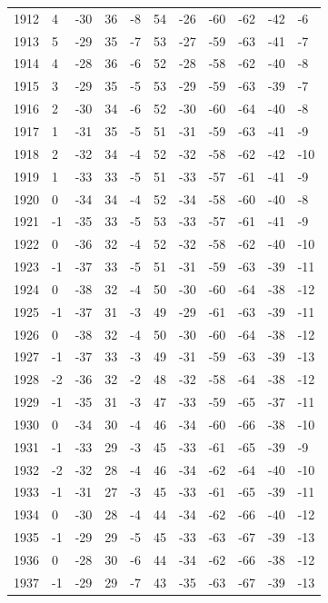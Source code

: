 \begin{table}[H]
\begin{tabular}{lllllllllll}
1912 & 4 & -30 & 36 & -8 & 54 & -26 & -60 & -62 & -42 & -6 \\
1913 & 5 & -29 & 35 & -7 & 53 & -27 & -59 & -63 & -41 & -7 \\
1914 & 4 & -28 & 36 & -6 & 52 & -28 & -58 & -62 & -40 & -8 \\
1915 & 3 & -29 & 35 & -5 & 53 & -29 & -59 & -63 & -39 & -7 \\
1916 & 2 & -30 & 34 & -6 & 52 & -30 & -60 & -64 & -40 & -8 \\
1917 & 1 & -31 & 35 & -5 & 51 & -31 & -59 & -63 & -41 & -9 \\
1918 & 2 & -32 & 34 & -4 & 52 & -32 & -58 & -62 & -42 & -10 \\
1919 & 1 & -33 & 33 & -5 & 51 & -33 & -57 & -61 & -41 & -9 \\
1920 & 0 & -34 & 34 & -4 & 52 & -34 & -58 & -60 & -40 & -8 \\
1921 & -1 & -35 & 33 & -5 & 53 & -33 & -57 & -61 & -41 & -9 \\
1922 & 0 & -36 & 32 & -4 & 52 & -32 & -58 & -62 & -40 & -10 \\
1923 & -1 & -37 & 33 & -5 & 51 & -31 & -59 & -63 & -39 & -11 \\
1924 & 0 & -38 & 32 & -4 & 50 & -30 & -60 & -64 & -38 & -12 \\
1925 & -1 & -37 & 31 & -3 & 49 & -29 & -61 & -63 & -39 & -11 \\
1926 & 0 & -38 & 32 & -4 & 50 & -30 & -60 & -64 & -38 & -12 \\
1927 & -1 & -37 & 33 & -3 & 49 & -31 & -59 & -63 & -39 & -13 \\
1928 & -2 & -36 & 32 & -2 & 48 & -32 & -58 & -64 & -38 & -12 \\
1929 & -1 & -35 & 31 & -3 & 47 & -33 & -59 & -65 & -37 & -11 \\
1930 & 0 & -34 & 30 & -4 & 46 & -34 & -60 & -66 & -38 & -10 \\
1931 & -1 & -33 & 29 & -3 & 45 & -33 & -61 & -65 & -39 & -9 \\
1932 & -2 & -32 & 28 & -4 & 46 & -34 & -62 & -64 & -40 & -10 \\
1933 & -1 & -31 & 27 & -3 & 45 & -33 & -61 & -65 & -39 & -11 \\
1934 & 0 & -30 & 28 & -4 & 44 & -34 & -62 & -66 & -40 & -12 \\
1935 & -1 & -29 & 29 & -5 & 45 & -33 & -63 & -67 & -39 & -13 \\
1936 & 0 & -28 & 30 & -6 & 44 & -34 & -62 & -66 & -38 & -12 \\
1937 & -1 & -29 & 29 & -7 & 43 & -35 & -63 & -67 & -39 & -13 \\

\end{tabular}
\end{table}
